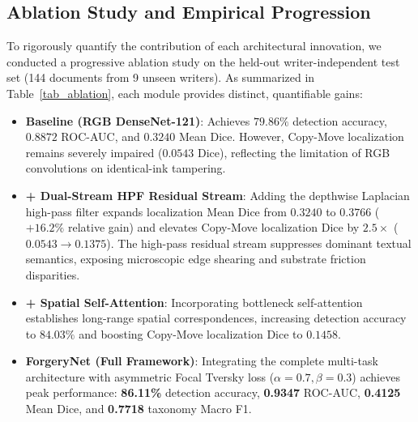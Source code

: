 \documentclass[runningheads]{llncs}
\begin{document}
\subsection{Ablation Study and Empirical Progression}\label{subsec5_3}
To rigorously quantify the contribution of each architectural innovation, we conducted a progressive ablation study on the held-out writer-independent test set (144 documents from 9 unseen writers). As summarized in Table~\ref{tab_ablation}, each module provides distinct, quantifiable gains:
\begin{itemize}
    \item \textbf{Baseline (RGB DenseNet-121)}: Achieves $79.86\%$ detection accuracy, $0.8872$ ROC-AUC, and $0.3240$ Mean Dice. However, Copy-Move localization remains severely impaired ($0.0543$ Dice), reflecting the limitation of RGB convolutions on identical-ink tampering.
    \item \textbf{+ Dual-Stream HPF Residual Stream}: Adding the depthwise Laplacian high-pass filter expands localization Mean Dice from $0.3240$ to $0.3766$ ($+16.2\%$ relative gain) and elevates Copy-Move localization Dice by $2.5\times$ ($0.0543 \rightarrow 0.1375$). The high-pass residual stream suppresses dominant textual semantics, exposing microscopic edge shearing and substrate friction disparities.
    \item \textbf{+ Spatial Self-Attention}: Incorporating bottleneck self-attention establishes long-range spatial correspondences, increasing detection accuracy to $84.03\%$ and boosting Copy-Move localization Dice to $0.1458$.
    \item \textbf{ForgeryNet (Full Framework)}: Integrating the complete multi-task architecture with asymmetric Focal Tversky loss ($\alpha=0.7, \beta=0.3$) achieves peak performance: \textbf{86.11\%} detection accuracy, \textbf{0.9347} ROC-AUC, \textbf{0.4125} Mean Dice, and \textbf{0.7718} taxonomy Macro F1.
\end{itemize}
\end{document}
